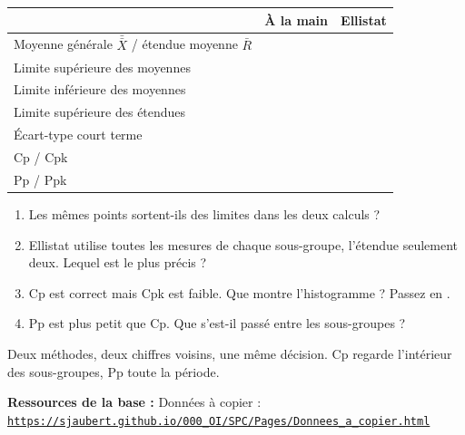 \documentclass[10pt,a4paper]{article}
\begin{document}
{\renewcommand{\arraystretch}{1.4}\begin{tabularx}{\linewidth}{|X|c|c|}\hline & \textbf{À la main} & \textbf{Ellistat}\\\hline
Moyenne générale $\bar{\bar X}$ \quad / \quad étendue moyenne $\bar R$ & \hspace{28mm} & \hspace{28mm}\\\hline
Limite supérieure des moyennes & \hspace{28mm} & \hspace{28mm}\\\hline
Limite inférieure des moyennes & \hspace{28mm} & \hspace{28mm}\\\hline
Limite supérieure des étendues & \hspace{28mm} & \hspace{28mm}\\\hline
Écart-type court terme & \hspace{28mm} & \hspace{28mm}\\\hline
Cp \quad / \quad Cpk & \hspace{28mm} & \hspace{28mm}\\\hline
Pp \quad / \quad Ppk & \hspace{28mm} & \hspace{28mm}\\\hline
\end{tabularx}}\par
{}
\begin{enumerate}[label=\textcolor{cyan}{\textbf{Q\arabic*.}},leftmargin=22pt]
\item Les mêmes points sortent-ils des limites dans les deux calculs ?\reponse[1]
\item Ellistat utilise toutes les mesures de chaque sous-groupe, l'étendue seulement deux. Lequel est le plus précis ?\reponse[1]
\item Cp est correct mais Cpk est faible. Que montre l'histogramme ? Passez en .\reponse[2]
\item Pp est plus petit que Cp. Que s'est-il passé entre les sous-groupes ?\reponse[1]
\end{enumerate}
\begin{tcolorbox}[retenir]Deux méthodes, deux chiffres voisins, une même décision. Cp regarde l'intérieur des sous-groupes, Pp toute la période.\end{tcolorbox}
\vfill{\footnotesize\color{uimm}\textbf{Ressources de la base :} Données à copier : \href{https://sjaubert.github.io/000_OI/SPC/Pages/Donnees_a_copier.html\#butees6}{\nolinkurl{https://sjaubert.github.io/000_OI/SPC/Pages/Donnees_a_copier.html}}}
\end{document}
